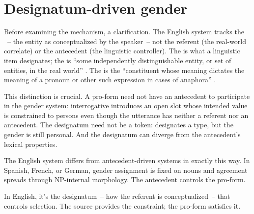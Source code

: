 \section{Designatum-driven gender}
\label{sec:12:designatum}

Before examining the mechanism, a clarification. The English system tracks the ~-- the entity as conceptualized by the speaker~-- not the referent (the real-world correlate) or the antecedent (the linguistic controller). The  is what a linguistic item designates; the  is \enquote{some independently distinguishable entity, or set of entities, in the real world} \autocite[399]{huddleston2002}. The  is the \enquote{constituent whose meaning dictates the meaning of a pronoun or other such expression in cases of anaphora} \autocite[295]{huddleston2005}.

This distinction is crucial. A pro-form need not have an antecedent to participate in the gender system: interrogative  introduces an open slot whose intended value is constrained to persons even though the utterance has neither a referent nor an antecedent. The designatum need not be a token:  designates a type, but the gender is still personal. And the designatum can diverge from the antecedent's lexical properties.

The English system differs from antecedent-driven systems in exactly this way. In Spanish, French, or German, gender assignment is fixed on nouns and agreement spreads through NP-internal morphology. The antecedent controls the pro-form.

In English, it's the designatum~-- how the referent is conceptualized~-- that controls selection. The source provides the constraint; the pro-form satisfies it.

